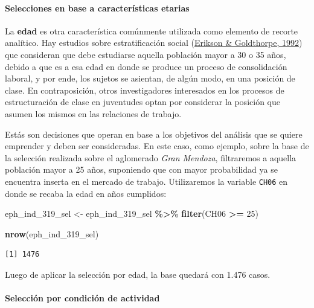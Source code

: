 \documentclass[
]{article}
\newenvironment{Shaded}{\begin{snugshade}}{\end{snugshade}}
\newcommand{\DecValTok}[1]{\textcolor[rgb]{0.00,0.00,0.81}{#1}}
\newcommand{\FunctionTok}[1]{\textcolor[rgb]{0.13,0.29,0.53}{\textbf{#1}}}
\newcommand{\NormalTok}[1]{#1}
\newcommand{\OtherTok}[1]{\textcolor[rgb]{0.56,0.35,0.01}{#1}}
\newcommand{\SpecialCharTok}[1]{\textcolor[rgb]{0.81,0.36,0.00}{\textbf{#1}}}
\begin{document}
\hypertarget{selecciones-en-base-a-caracteruxedsticas-etarias}{%
\paragraph{Selecciones en base a características etarias}\label{selecciones-en-base-a-caracteruxedsticas-etarias}}

La \textbf{edad} es otra característica comúnmente utilizada como elemento de recorte analítico. Hay estudios sobre estratificación social (\protect\hyperlink{ref-Erikson1992}{Erikson \& Goldthorpe, 1992}) que consideran que debe estudiarse aquella población mayor a 30 o 35 años, debido a que es a esa edad en donde se produce un proceso de consolidación laboral, y por ende, los sujetos se asientan, de algún modo, en una posición de clase. En contraposición, otros investigadores interesados en los procesos de estructuración de clase en juventudes optan por considerar la posición que asumen los mismos en las relaciones de trabajo.

Estás son decisiones que operan en base a los objetivos del análisis que se quiere emprender y deben ser consideradas. En este caso, como ejemplo, sobre la base de la selección realizada sobre el aglomerado \emph{Gran Mendoza}, filtraremos a aquella población mayor a 25 años, suponiendo que con mayor probabilidad ya se encuentra inserta en el mercado de trabajo. Utilizaremos la variable \texttt{CH06} en donde se recaba la edad en años cumplidos:

\begin{Shaded}
\begin{Highlighting}[]
\NormalTok{eph\_ind\_319\_sel }\OtherTok{\textless{}{-}}\NormalTok{ eph\_ind\_319\_sel }\SpecialCharTok{\%\textgreater{}\%}
    \FunctionTok{filter}\NormalTok{(CH06 }\SpecialCharTok{\textgreater{}=} \DecValTok{25}\NormalTok{)}

\FunctionTok{nrow}\NormalTok{(eph\_ind\_319\_sel)}
\end{Highlighting}
\end{Shaded}

\begin{verbatim}
[1] 1476
\end{verbatim}

Luego de aplicar la selección por edad, la base quedará con 1.476 casos.

\hypertarget{selecciuxf3n-por-condiciuxf3n-de-actividad}{%
\paragraph{Selección por condición de actividad}\label{selecciuxf3n-por-condiciuxf3n-de-actividad}}
\end{document}

